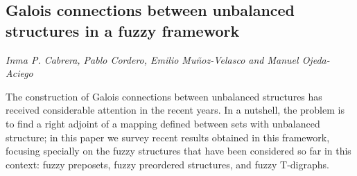 \documentclass[../booklet.tex]{subfiles}
\begin{document}
\subsection[Galois connections between unbalanced  structures in a fuzzy framework. {\it Inma P. Cabrera, Pablo Cordero, Emilio Muñoz-Velasco and Manuel Ojeda-Aciego}]{Galois connections between unbalanced  structures in a fuzzy framework}
   

\begin{center}
  {\it Inma P. Cabrera, Pablo Cordero, Emilio Muñoz-Velasco and Manuel Ojeda-Aciego}
\end{center}

\vskip 0.8cm


The construction of Galois connections between unbalanced structures has received considerable attention in the recent years. 
In a nutshell, the problem is to find a right adjoint of a mapping defined between sets with unbalanced structure; in this paper we survey recent results obtained in this framework, focusing specially on    the fuzzy structures that have been considered so far in this context:
   fuzzy preposets, fuzzy preordered structures,      and fuzzy T-digraphs.
 
\end{document}
